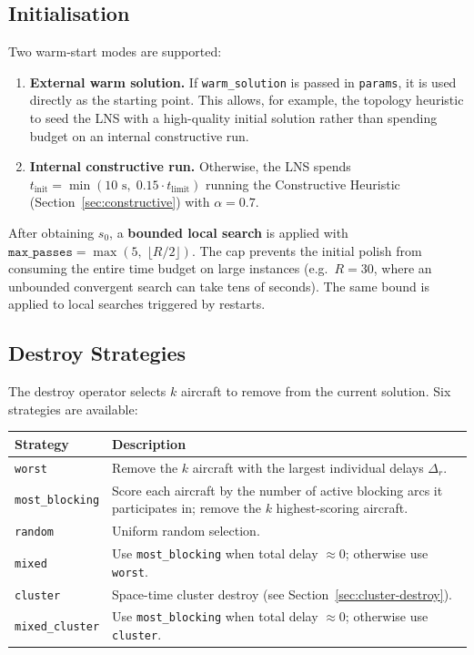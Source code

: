 \subsection{Initialisation}

Two warm-start modes are supported:

\begin{enumerate}[noitemsep]
    \item \textbf{External warm solution.}  If \texttt{warm\_solution} is
          passed in \texttt{params}, it is used directly as the starting point.
          This allows, for example, the topology heuristic to seed the LNS
          with a high-quality initial solution rather than spending budget on
          an internal constructive run.
    \item \textbf{Internal constructive run.}  Otherwise, the LNS spends
          $t_{\text{init}} = \min(10\text{ s},\; 0.15 \cdot t_{\text{limit}})$
          running the Constructive Heuristic (Section~\ref{sec:constructive})
          with $\alpha = 0.7$.
\end{enumerate}

After obtaining $s_0$, a \textbf{bounded local search} is applied with
$\texttt{max\_passes} = \max(5,\; \lfloor R/2 \rfloor)$.  The cap prevents
the initial polish from consuming the entire time budget on large instances
(e.g.\ $R=30$, where an unbounded convergent search can take tens of seconds).
The same bound is applied to local searches triggered by restarts.

\subsection{Destroy Strategies}
\label{sec:destroy}

The destroy operator selects $k$ aircraft to remove from the current solution.
Six strategies are available:

\begin{center}
\begin{tabular}{lp{8.5cm}}
\toprule
Strategy & Description \\
\midrule
\texttt{worst} & Remove the $k$ aircraft with the largest individual delays
    $\Delta_r$. \\
\texttt{most\_blocking} & Score each aircraft by the number of active blocking
    arcs it participates in; remove the $k$ highest-scoring aircraft. \\
\texttt{random} & Uniform random selection. \\
\texttt{mixed} & Use \texttt{most\_blocking} when total delay $\approx 0$;
    otherwise use \texttt{worst}. \\
\texttt{cluster} & Space-time cluster destroy
    (see Section~\ref{sec:cluster-destroy}). \\
\texttt{mixed\_cluster} & Use \texttt{most\_blocking} when total delay $\approx 0$;
    otherwise use \texttt{cluster}. \\
\bottomrule
\end{tabular}
\end{center}

